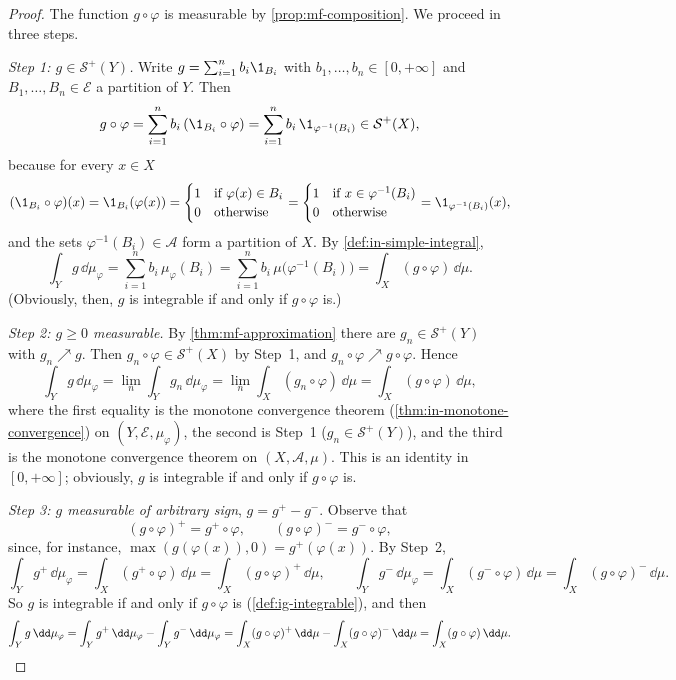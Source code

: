 \begin{proof}
The function $g\circ\varphi$ is measurable by \cref{prop:mf-composition}. We proceed in three
steps.

\emph{Step 1: $g\in\mathcal S^+(Y)$.} Write $g=\sum_{i=1}^nb_i\1_{B_i}$ with
$b_1,\dots,b_n\in[0,+\infty]$ and $B_1,\dots,B_n\in\mathcal E$ a partition of $Y$. Then
\[
  g\circ\varphi=\sum_{i=1}^nb_i\,(\1_{B_i}\circ\varphi)=\sum_{i=1}^nb_i\,\1_{\varphi^{-1}(B_i)}\in\mathcal S^+(X),
\]
because for every $x\in X$
\[
  (\1_{B_i}\circ\varphi)(x)=\1_{B_i}(\varphi(x))=
  \begin{cases}1&\text{if }\varphi(x)\in B_i\\0&\text{otherwise}\end{cases}
  =\begin{cases}1&\text{if }x\in\varphi^{-1}(B_i)\\0&\text{otherwise}\end{cases}
  =\1_{\varphi^{-1}(B_i)}(x),
\]
and the sets $\varphi^{-1}(B_i)\in\mathcal A$ form a partition of $X$. By
\cref{def:in-simple-integral},
\[
  \int_Yg\,\dd\mu_\varphi=\sum_{i=1}^nb_i\,\mu_\varphi(B_i)=\sum_{i=1}^nb_i\,\mu\big(\varphi^{-1}(B_i)\big)
  =\int_X(g\circ\varphi)\,\dd\mu .
\]
(Obviously, then, $g$ is integrable if and only if $g\circ\varphi$ is.)

\emph{Step 2: $g\ge0$ measurable.} By \cref{thm:mf-approximation} there are $g_n\in\mathcal S^+(Y)$
with $g_n\nearrow g$. Then $g_n\circ\varphi\in\mathcal S^+(X)$ by Step~1, and
$g_n\circ\varphi\nearrow g\circ\varphi$. Hence
\[
  \int_Yg\,\dd\mu_\varphi=\lim_n\int_Yg_n\,\dd\mu_\varphi=\lim_n\int_X(g_n\circ\varphi)\,\dd\mu
  =\int_X(g\circ\varphi)\,\dd\mu,
\]
where the first equality is the monotone convergence theorem (\cref{thm:in-monotone-convergence})
on $(Y,\mathcal E,\mu_\varphi)$, the second is Step~1 ($g_n\in\mathcal S^+(Y)$), and the third is
the monotone convergence theorem on $(X,\mathcal A,\mu)$. This is an identity in $[0,+\infty]$;
obviously, $g$ is integrable if and only if $g\circ\varphi$ is.

\emph{Step 3: $g$ measurable of arbitrary sign}, $g=g^+-g^-$. Observe that
\[
  (g\circ\varphi)^+=g^+\circ\varphi,\qquad(g\circ\varphi)^-=g^-\circ\varphi,
\]
since, for instance, $\max(g(\varphi(x)),0)=g^+(\varphi(x))$. By Step~2,
\[
  \int_Yg^+\,\dd\mu_\varphi=\int_X(g^+\circ\varphi)\,\dd\mu=\int_X(g\circ\varphi)^+\,\dd\mu,\qquad
  \int_Yg^-\,\dd\mu_\varphi=\int_X(g^-\circ\varphi)\,\dd\mu=\int_X(g\circ\varphi)^-\,\dd\mu .
\]
So $g$ is integrable if and only if $g\circ\varphi$ is (\cref{def:ig-integrable}), and then
\[
  \int_Yg\,\dd\mu_\varphi=\int_Yg^+\,\dd\mu_\varphi-\int_Yg^-\,\dd\mu_\varphi
  =\int_X(g\circ\varphi)^+\,\dd\mu-\int_X(g\circ\varphi)^-\,\dd\mu=\int_X(g\circ\varphi)\,\dd\mu .\qedhere
\]
\end{proof}

